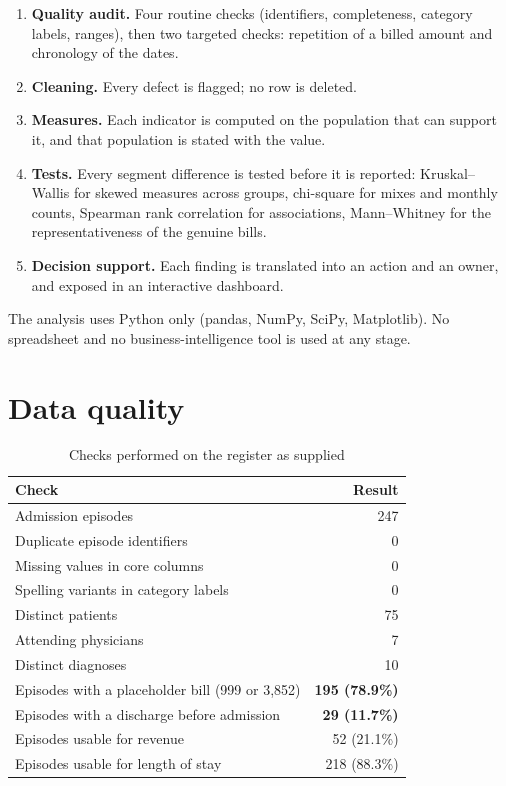\documentclass[12pt,a4paper]{article}
\begin{document}
\begin{enumerate}
\item \textbf{Quality audit.} Four routine checks (identifiers, completeness, category
labels, ranges), then two targeted checks: repetition of a billed amount and
chronology of the dates.
\item \textbf{Cleaning.} Every defect is flagged; no row is deleted.
\item \textbf{Measures.} Each indicator is computed on the population that can
support it, and that population is stated with the value.
\item \textbf{Tests.} Every segment difference is tested before it is reported:
Kruskal--Wallis for skewed measures across groups, chi-square for mixes and monthly
counts, Spearman rank correlation for associations, Mann--Whitney for the
representativeness of the genuine bills.
\item \textbf{Decision support.} Each finding is translated into an action and an
owner, and exposed in an interactive dashboard.
\end{enumerate}

The analysis uses Python only (pandas, NumPy, SciPy, Matplotlib). No spreadsheet
and no business-intelligence tool is used at any stage.

\section{Data quality}

\begin{table}[H]\centering\singlespacing
\caption{Checks performed on the register as supplied}
\small
\begin{tabular}{@{}lr@{}}
\toprule
\textbf{Check} & \textbf{Result} \\ \midrule
Admission episodes & 247 \\
Duplicate episode identifiers & 0 \\
Missing values in core columns & 0 \\
Spelling variants in category labels & 0 \\
Distinct patients & 75 \\
Attending physicians & 7 \\
Distinct diagnoses & 10 \\ \midrule
Episodes with a placeholder bill (999 or 3{,}852) & \textbf{195 \enspace(78.9\%)} \\
Episodes with a discharge before admission & \textbf{29 \enspace(11.7\%)} \\ \midrule
Episodes usable for revenue & 52 \enspace(21.1\%) \\
Episodes usable for length of stay & 218 \enspace(88.3\%) \\
\bottomrule
\end{tabular}
\end{table}
\end{document}
